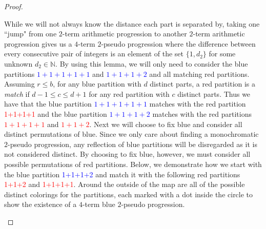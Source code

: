 \documentclass[ fontsize=10pt,twoside]{scrartcl}	%
\newcommand*\circled[1]{\tikz[baseline=(char.base)]{
            \node[shape=circle,draw,inner sep=2pt] (char) {#1};}}
\begin{document}
\begin{proof}
\begin{center}
\begin{tikzpicture}[scale=1]
\end{tikzpicture}
\end{center}
While we will not always know the distance each part is separated by, taking one ``jump" from one $2$-term arithmetic progression to another $2$-term arithmetic progression gives us a $4$-term $2$-pseudo progression where the difference between every consecutive pair of integers is an element of the set $\{1,d_2\}$ for some unknown $d_2 \in \mathbb{N}$. By using this lemma, we will only need to consider the blue partitions \textcolor{blue}{$1+1+1+1+1$} and \textcolor{blue}{$1+1+1+2$} and all matching red partitions. Assuming $r\leq b$, for any blue partition with $d$ distinct parts, a red partition is a \emph{match} if $d-1 \leq c \leq d+1$ for any red partition with $c$ distinct parts. Thus we have that the blue partition \textcolor{blue}{$1+1+1+1+1$} matches with the red partition \textcolor{red}{1+1+1+1} and the blue partition \textcolor{blue}{$1+1+1+2$} matches with the red partitions \textcolor{red}{$1+1+1+1$} and \textcolor{red}{$1+1+2$}. Next we will choose to fix blue and consider all distinct permutations of blue. Since we only care about finding a monochromatic $2$-pseudo progression, any reflection of blue partitions will be disregarded as it is not considered distinct. By choosing to fix blue, however, we must consider all possible permutations of red partitions. Below, we demonstrate how we start with the blue partition \textcolor{blue}{1+1+1+2} and match it with the following red partitions \textcolor{red}{1+1+2} and \textcolor{red}{1+1+1+1}. Around the outside of the map are all of the possible distinct colorings for the partitions, each marked with a dot inside the circle to show the existence of a $4$-term blue $2$-pseudo progression.
\begin{center}
\end{center}
\end{proof}
\end{document}
